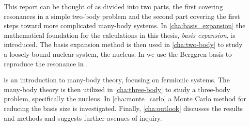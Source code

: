 \documentclass[../main/report.tex]{subfiles}
\begin{document}
This report can be thought of as divided into two parts, the first covering resonances in a simple two-body problem and the second part covering the first steps toward more complicated many-body systems. 
In \cref{cha:basis_expansion} the mathematical foundation for the calculations in this thesis, \emph{basis expansion}, is introduced.
The basis expansion method is then used in \cref{cha:two-body} to study a loosely bound nuclear system, the  nucleus.
In  we use the Berggren basis to reproduce the resonance in .

 is an introduction to many-body theory, focusing on fermionic systems. 
The many-body theory is then utilized in \cref{cha:three-body} 
to study a three-body problem, specifically the  nucleus.  
In \cref{cha:monte_carlo} a Monte Carlo method for reducing the basis size is investigated. 
Finally, \cref{cha:outlook} discusses the results and methods and suggests further avenues of inquiry.
\end{document}
